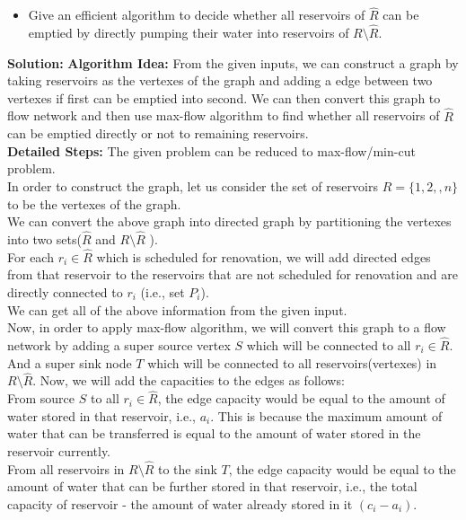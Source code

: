 \documentclass[12pt]{article}
\begin{document}
\begin{enumerate}
\begin{itemize}
\item Give an efficient algorithm to decide whether all reservoirs of $\widehat{R}$ can be emptied by directly pumping their water into reservoirs of $ R \setminus \widehat{R}$.
\end{itemize}
\textbf{Solution:} \textbf{Algorithm Idea:} From the given inputs, we can construct a graph by taking reservoirs as the vertexes of the graph and adding a edge between two vertexes if first can be emptied into second. We can then convert this graph to flow network and then use max-flow algorithm to find whether all reservoirs of $\widehat{R}$ can be emptied directly or not to remaining reservoirs.\\
\textbf{Detailed Steps:}
The given problem can be reduced to max-flow/min-cut problem.\\
In order to construct the graph, let us consider the set of reservoirs $R = \{1, 2, , n\}$ to be the vertexes of the graph. \\
We can convert the above graph into directed graph by partitioning the vertexes into two sets($\widehat{R}$ and $R \setminus \widehat{R}$ ).\\
For each $r_i \in \widehat{R}$ which is scheduled for renovation, we will add directed edges from that reservoir to the reservoirs that are not scheduled for renovation and are directly connected to $r_i$ (i.e., set $P_i$). \\
We can get all of the above information from the given input.\\
Now, in order to apply max-flow algorithm, we will convert this graph to a flow network by adding a super source vertex $S$ which will be connected to all $r_i \in \widehat{R}$.\\
And a super sink node $T$ which will be connected to all reservoirs(vertexes) in $R \setminus \widehat{R}$.
Now, we will add the capacities to the edges as follows:\\
From source $S$ to all $r_i \in \widehat{R}$, the edge capacity would be equal to the amount of water stored in that reservoir, i.e., $a_i$. This is because the maximum amount of water that can be transferred is equal to the amount of water stored in the reservoir currently.\\
From all reservoirs in $R \setminus \widehat{R}$ to the sink $T$, the edge capacity would be equal to the amount of water that can be further stored in that reservoir, i.e., the total capacity of reservoir - the amount of water already stored in it $(c_i - a_i)$.\\

\end{enumerate}
\end{document}
